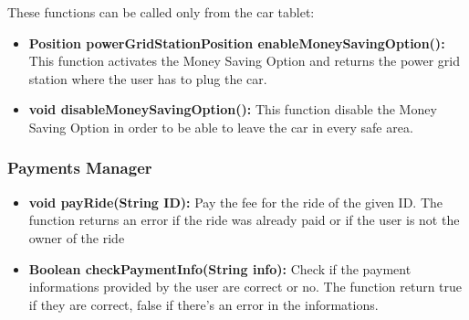 These functions can be called only from the car tablet:
\begin{itemize}
	\item \textbf{Position powerGridStationPosition enableMoneySavingOption():} This function activates the Money Saving Option and returns the power grid station where the user has to plug the car.
	\item \textbf{void disableMoneySavingOption():} This function disable the Money Saving Option in order to be able to leave the car in every safe area.
\end{itemize}

\subsubsection{Payments Manager}
\begin{itemize}
	\item \textbf{void payRide(String ID):} Pay the fee for the ride of the given ID. The function returns an error if the ride was already paid or if the user is not the owner of the ride
	\item \textbf{Boolean checkPaymentInfo(String info):} Check if the payment informations provided by the user are correct or no. The function return true if they are correct, false if there's an error in the informations.
\end{itemize}
